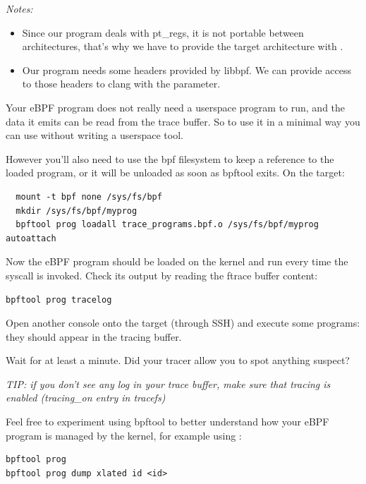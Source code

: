 \begin{itemize}
{\em Notes:
\begin{itemize}
    \item Since our program deals with pt\_regs, it is not portable
        between architectures, that's why we have to provide the
        target architecture with
        .
    \item Our program needs some headers provided by libbpf. We can
        provide access to those headers to clang with the 
        parameter.
\end{itemize}
}

\end{itemize}

Your eBPF program does not really need a userspace program to run, and the
data it emits can be read from the trace buffer. So to use it in a minimal
way you can use  without writing a userspace tool.

However you'll also need to use the bpf filesystem to keep a reference to
the loaded program, or it will be unloaded as soon as bpftool exits. On the
target:

\begin{verbatim}
  mount -t bpf none /sys/fs/bpf
  mkdir /sys/fs/bpf/myprog
  bpftool prog loadall trace_programs.bpf.o /sys/fs/bpf/myprog autoattach
\end{verbatim}

Now the eBPF program should be loaded on the kernel and run every time
the  syscall is invoked. Check its output by reading the
ftrace buffer content:

\begin{verbatim}
bpftool prog tracelog
\end{verbatim}

Open another console onto the target (through SSH) and execute some
programs: they should appear in the tracing buffer.

Wait for at least a minute. Did your tracer allow you to spot anything
suspect?

{\em TIP: if you don't see any log in your trace buffer, make sure that
tracing is enabled (tracing\_on entry in tracefs)}

Feel free to experiment using bpftool to better understand how your eBPF
program is managed by the kernel, for example using :

\begin{verbatim}
bpftool prog
bpftool prog dump xlated id <id>
\end{verbatim}

